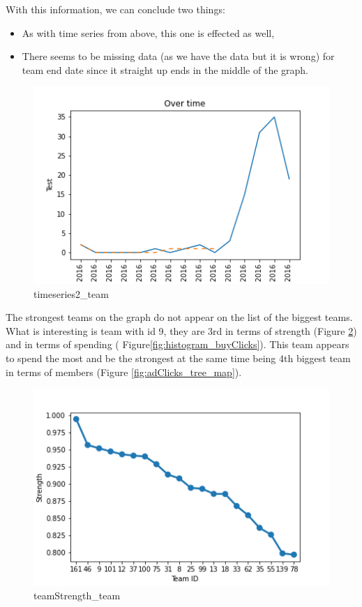 With this information, we can conclude two things:
\begin{itemize}
    \item As with time series from above, this one is effected as well,
    \item There seems to be missing data (as we have the data but it is wrong) for team end date since it straight up ends in the middle of the graph.
\end{itemize}
\begin{figure}[H]
\includegraphics[scale=0.85]{img/Graphs/team/timeseries2_team.png}
\centering
\caption{timeseries2\_team}
\label{fig:timeseries2_team}
\end{figure}

The strongest teams on the graph do not appear on the list of the biggest teams. What is interesting is team with id 9, they are 3rd in terms of strength (Figure \ref{fig:teamStrength_team}) and in terms of spending ( Figure\ref{fig:histogram_buyClicks}). This team appears to spend the most and be the strongest at the same time being 4th biggest team in terms of members (Figure \ref{fig:adClicks_tree_map}).
\begin{figure}[H]
\includegraphics[scale=0.85]{img/Graphs/team/teamStrength_team.png}
\centering
\caption{teamStrength\_team}
\label{fig:teamStrength_team}
\end{figure}

